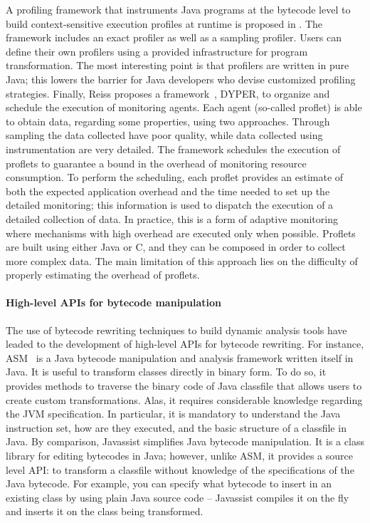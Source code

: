 A profiling framework that instruments Java programs at the bytecode level to build context-sensitive execution profiles at runtime is proposed in \cite{Binder2005}.
The framework includes an exact profiler as well as a sampling profiler.
Users can define their own profilers using a provided infrastructure for program transformation.
The most interesting point is that profilers are written in pure Java; this lowers the barrier for Java developers who devise customized profiling strategies.
Finally, Reiss proposes a framework~\cite{Reiss:2008:CDP:1383559.1383566}, DYPER, to organize and schedule the execution of monitoring agents.
Each agent (so-called proflet) is able to obtain data, regarding some properties, using two approaches.
Through sampling the data collected have poor quality, while data collected using instrumentation are very detailed.
The framework schedules the execution of proflets to guarantee a bound in the overhead of monitoring resource consumption.
To perform the scheduling, each proflet provides an estimate of both the expected application overhead and the time needed to set up the detailed monitoring; this information is used to dispatch the execution of a detailed collection of data.
In practice, this is a form of adaptive monitoring where mechanisms with high overhead are executed only when possible.
Proflets are built using either Java or C, and they can be composed in order to collect more complex data.
The main limitation of this approach
lies on the difficulty of properly estimating the overhead of proflets.

\paragraph{High-level APIs for bytecode manipulation}
The use of bytecode rewriting techniques to build dynamic analysis tools have leaded to the development of high-level APIs for bytecode rewriting.
For instance, ASM~\cite{Bruneton2002,Kuleshov2007} is a Java bytecode manipulation and analysis framework written itself in Java.
It is useful to transform classes directly in binary form.
To do so, it provides methods to traverse the binary code of Java classfile that allows users to create custom transformations.
Alas, it requires considerable knowledge regarding the JVM specification.
In particular, it is mandatory to understand the Java instruction set, how are they executed, and the basic structure of a classfile in Java.
By comparison, Javassist \cite{Javassist1999} simplifies Java bytecode manipulation.
It is a class library for editing bytecodes in Java; however, unlike ASM, it provides a source level API: to transform a classfile without knowledge of the specifications of the Java bytecode.
For example, you can specify what bytecode to insert in an existing class by using plain Java source code -- Javassist compiles it on the fly and inserts it on the class being transformed.


